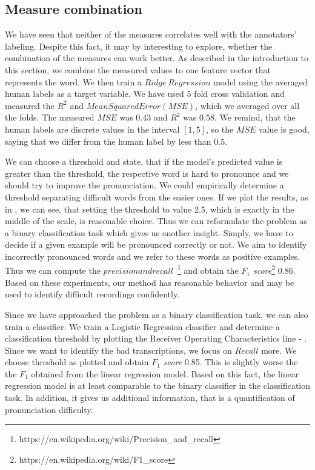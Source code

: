 \subsection{Measure combination}
We have seen that neither of the measures correlates well with the annotators' labeling.
Despite this fact, it may by interesting to explore, whether the combination of the measures can work better.
As described in the introduction to this section, we combine the measured values to one feature vector that represents the word.
We then train a $Ridge\: Regression$ model using the averaged human labels as a target variable.
We have used 5 fold cross validation and measured the $R^2$ and $Mean Squared Error (MSE)$, which we averaged over all the folds.
The measured $MSE$ was $0.43$ and $R^2$ was $0.58$.
We remind, that the human labels are discrete values in the interval $[1,5]$, so the $MSE$ value is good, saying that we differ from the human label by less than $0.5$.
\par
We can choose a threshold and state, that if the model's predicted value is greater than the threshold, the respective word is hard to pronounce and we should try to improve the pronunciation.
We could empirically determine a threshold separating difficult words from the easier ones.
If we plot the results, as in , we can see, that setting the threshold to value 2.5, which is exactly in the middle of the scale, is reasonable choice.
Thus we can reformulate the problem as a binary classification task which gives us another insight.
Simply, we have to decide if a given example will be pronounced correctly or not.
We aim to identify incorrectly pronounced words and we refer to these words as positive examples.
Thus we can compute the $precision and recall$~\footnote{https://en.wikipedia.org/wiki/Precision\_and\_recall} and obtain the \textit{$F_1$ score}\footnote{https://en.wikipedia.org/wiki/F1\_score} 0.86.
Based on these experiments, our method has reasonable behavior and may be used to identify difficult recordings confidently.
\par
Since we have approached the problem as a binary classification task, we can also train a classifier.
We train a Logistic Regression classifier and determine a classification threshold by plotting the Receiver Operating Characteristics line - .
Since we want to identify the bad transcriptions, we focus on $Recall$ more.
We choose threshold as plotted and obtain \textit{$F_1$ score} 0.85.
This is slightly worse the the \textit{$F_1$} obtained from the linear regression model.
Based on this fact, the linear regression model is at least comparable to the binary classifier in the classification task.
In addition, it gives us additional information, that is a quantification of pronunciation difficulty.
